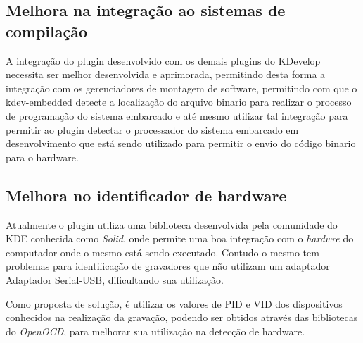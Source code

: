 \subsection{Melhora na integração ao sistemas de compilação}
A integração do plugin desenvolvido com os demais plugins do KDevelop necessita ser melhor desenvolvida e aprimorada, permitindo desta
forma a integração com os gerenciadores de montagem de software, permitindo com que o kdev-embedded detecte a localização do arquivo
binario para realizar o processo de programação do sistema embarcado e até mesmo utilizar tal integração para permitir ao plugin
detectar o processador do sistema embarcado em desenvolvimento que está sendo utilizado para permitir o envio do código binario para
o hardware.

\subsection{Melhora no identificador de hardware}
Atualmente o plugin utiliza uma biblioteca desenvolvida pela comunidade do KDE conhecida como \textit{Solid}, onde permite uma boa integração com o \textit{hardwre} do computador onde o mesmo está sendo executado. Contudo o mesmo tem problemas para identificação de gravadores que não utilizam um adaptador Adaptador Serial-USB, dificultando sua utilização. 

Como proposta de solução, é utilizar os valores de PID e VID dos dispositivos conhecidos na realização da gravação, podendo ser obtidos através das bibliotecas do \textit{OpenOCD}, para melhorar sua utilização na detecção de hardware.

